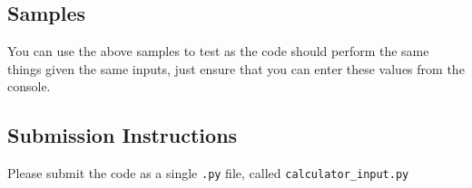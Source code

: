 \documentclass[11pt]{article}
\begin{document}
\subsection{Samples}
\label{sec:orgff64820}
You can use the above samples to test as the code should perform the same things given the same inputs, just ensure that you can enter these values from the console.
\subsection{Submission Instructions}
\label{sec:orge268839}
Please submit the code as a single \texttt{.py} file, called \texttt{calculator\_input.py}
\end{document}
